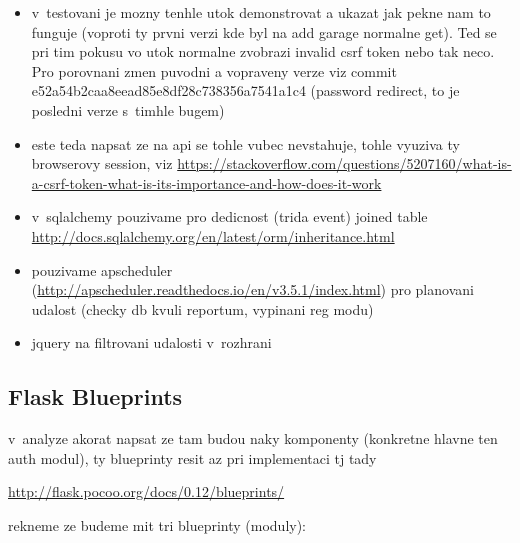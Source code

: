 \begin{itemize}
\item v~testovani je mozny tenhle utok demonstrovat a ukazat jak pekne nam to funguje (voproti ty prvni verzi kde byl na add garage normalne get). Ted se pri tim pokusu vo utok normalne zvobrazi invalid csrf token nebo tak neco. Pro porovnani zmen puvodni a vopraveny verze viz commit e52a54b2caa8eead85e8df28c738356a7541a1c4 (password redirect, to je posledni verze s~timhle bugem)

\item este teda napsat ze na api se tohle vubec nevstahuje, tohle vyuziva ty browserovy session, viz \url{https://stackoverflow.com/questions/5207160/what-is-a-csrf-token-what-is-its-importance-and-how-does-it-work}

\item v~sqlalchemy pouzivame pro dedicnost (trida event) joined table \url{http://docs.sqlalchemy.org/en/latest/orm/inheritance.html}

\item pouzivame apscheduler (\url{http://apscheduler.readthedocs.io/en/v3.5.1/index.html}) pro planovani udalost (checky db kvuli reportum, vypinani reg modu)

\item jquery na filtrovani udalosti v~rozhrani

\end{itemize}

\subsection{Flask Blueprints}

v~analyze akorat napsat ze tam budou naky komponenty (konkretne hlavne ten auth modul), ty blueprinty resit az pri implementaci tj tady

\url{http://flask.pocoo.org/docs/0.12/blueprints/}

rekneme ze budeme mit tri blueprinty (moduly):

